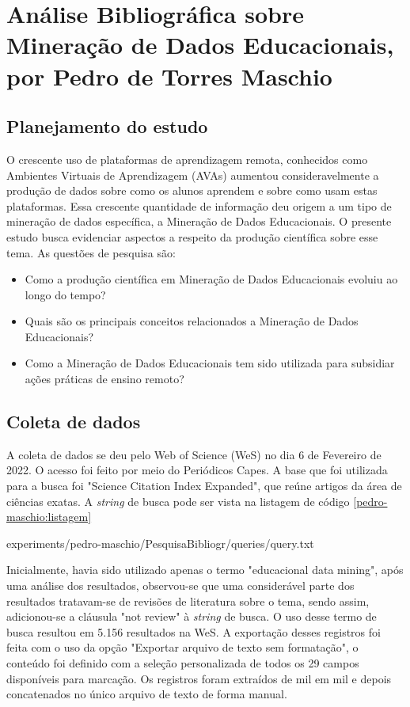 \chapter{Análise Bibliográfica sobre Mineração de Dados Educacionais, por Pedro de Torres Maschio\label{chap:bibliometria:pedro-maschio}}


\section{Planejamento do estudo}

O crescente uso de plataformas de aprendizagem remota, conhecidos como Ambientes Virtuais de Aprendizagem (AVAs) aumentou consideravelmente a produção de dados sobre como os alunos aprendem e sobre como usam estas plataformas. Essa crescente quantidade de informação deu origem a um tipo de mineração de dados específica, a Mineração de Dados Educacionais. O presente estudo busca evidenciar aspectos a respeito da produção científica sobre esse tema. As questões de pesquisa são:

\begin{itemize}
    \item Como a produção científica em Mineração de Dados Educacionais evoluiu ao longo do tempo?
    \item Quais são os principais conceitos relacionados a Mineração de Dados Educacionais?
    \item Como a Mineração de Dados Educacionais tem sido utilizada para subsidiar ações práticas de ensino remoto?
\end{itemize}

\section{Coleta de dados}

A coleta de dados se deu pelo Web of Science (WeS) no dia 6 de Fevereiro de 2022. O acesso foi feito por meio do Periódicos Capes. A base que foi utilizada para a busca foi "Science Citation Index Expanded", que reúne artigos da área de ciências exatas. A \textit{string} de busca pode ser vista na listagem de código \ref{pedro-maschio:listagem}


{experiments/pedro-maschio/PesquisaBibliogr/queries/query.txt}


Inicialmente, havia sido utilizado apenas o termo "educacional data mining", após uma análise dos resultados, observou-se que uma considerável parte dos resultados tratavam-se de revisões de literatura sobre o tema, sendo assim, adicionou-se a cláusula "not review" à \textit{string} de busca.
O uso desse termo de busca resultou em 5.156 resultados na WeS. A exportação desses registros foi feita com o uso da opção "Exportar arquivo de texto sem formatação", o conteúdo foi definido com a seleção personalizada de todos os 29 campos disponíveis para marcação. Os registros foram extraídos de mil em mil e depois concatenados no único arquivo de texto de forma manual.

